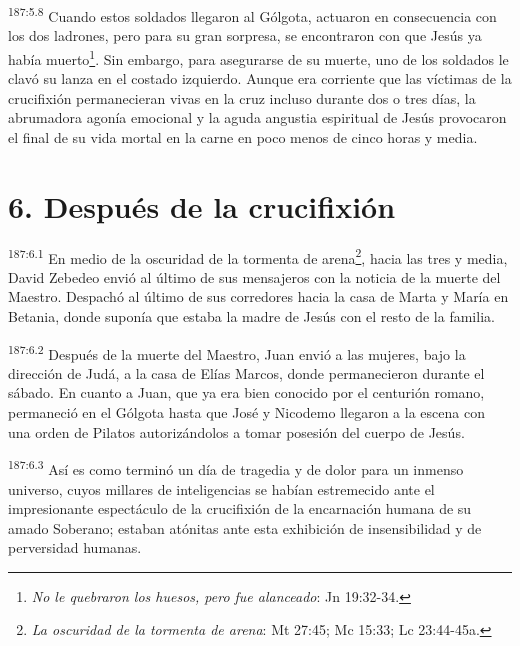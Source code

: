 \par
\textsuperscript{187:5.8} Cuando estos soldados llegaron al Gólgota, actuaron en consecuencia con los dos ladrones, pero para su gran sorpresa, se encontraron con que Jesús ya había muerto\footnote{\textit{No le quebraron los huesos, pero fue alanceado}: Jn 19:32-34.}. Sin embargo, para asegurarse de su muerte, uno de los soldados le clavó su lanza en el costado izquierdo. Aunque era corriente que las víctimas de la crucifixión permanecieran vivas en la cruz incluso durante dos o tres días, la abrumadora agonía emocional y la aguda angustia espiritual de Jesús provocaron el final de su vida mortal en la carne en poco menos de cinco horas y media.

\section*{6. Después de la crucifixión}
\par
\textsuperscript{187:6.1} En medio de la oscuridad de la tormenta de arena\footnote{\textit{La oscuridad de la tormenta de arena}: Mt 27:45; Mc 15:33; Lc 23:44-45a.}, hacia las tres y media, David Zebedeo envió al último de sus mensajeros con la noticia de la muerte del Maestro. Despachó al último de sus corredores hacia la casa de Marta y María en Betania, donde suponía que estaba la madre de Jesús con el resto de la familia.

\par
\textsuperscript{187:6.2} Después de la muerte del Maestro, Juan envió a las mujeres, bajo la dirección de Judá, a la casa de Elías Marcos, donde permanecieron durante el sábado. En cuanto a Juan, que ya era bien conocido por el centurión romano, permaneció en el Gólgota hasta que José y Nicodemo llegaron a la escena con una orden de Pilatos autorizándolos a tomar posesión del cuerpo de Jesús.

\par
\textsuperscript{187:6.3} Así es como terminó un día de tragedia y de dolor para un inmenso universo, cuyos millares de inteligencias se habían estremecido ante el impresionante espectáculo de la crucifixión de la encarnación humana de su amado Soberano; estaban atónitas ante esta exhibición de insensibilidad y de perversidad humanas.